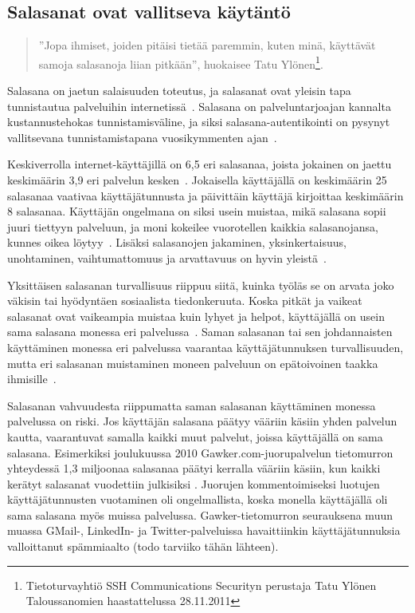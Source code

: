 \documentclass[finnish,gradu]{tktltiki}
\begin{document}
  \subsection{Salasanat ovat vallitseva käytäntö} %
  \label{sub:salasanat}

  \begin{quote}
    ''Jopa ihmiset, joiden pitäisi tietää paremmin, kuten minä, käyttävät samoja salasanoja liian pitkään'', huokaisee Tatu Ylönen\footnote{Tietoturvayhtiö SSH Communications Securityn perustaja Tatu Ylönen Taloussanomien haastattelussa 28.11.2011}.
  \end{quote}

  Salasana on jaetun salaisuuden toteutus, ja salasanat ovat yleisin tapa tunnistautua palveluihin internetissä~\cite{study_of_passwords_07, passpet_06, password_management_strategies_06, pwdhash_extension_05}. Salasana on palveluntarjoajan kannalta kustannustehokas tunnistamisväline, ja siksi salasana-autentikointi on pysynyt vallitsevana tunnistamistapana vuosikymmenten ajan~\cite{pw_auth_system_perspective_08}.

  Keskiverrolla internet-käyttäjillä on 6,5 eri salasanaa, joista jokainen on jaettu keskimäärin 3,9 eri palvelun kesken~\cite{study_of_passwords_07}. Jokaisella käyttäjällä on keskimäärin 25 salasanaa vaativaa käyttäjätunnusta ja päivittäin käyttäjä kirjoittaa keskimäärin 8 salasanaa. Käyttäjän ongelmana on siksi usein muistaa, mikä salasana sopii juuri tiettyyn palveluun, ja moni kokeilee vuorotellen kaikkia salasanojansa, kunnes oikea löytyy~\cite{study_of_passwords_07}. Lisäksi salasanojen jakaminen, yksinkertaisuus, unohtaminen, vaihtumattomuus ja arvattavuus on hyvin yleistä~\cite{password_management_strategies_06, pw_auth_system_perspective_08, passpet_06}.

  Yksittäisen salasanan turvallisuus riippuu siitä, kuinka työläs se on arvata joko väkisin tai hyödyntäen sosiaalista tiedonkeruuta. Koska pitkät ja vaikeat salasanat ovat vaikeampia muistaa kuin lyhyet ja helpot, käyttäjällä on usein sama salasana monessa eri palvelussa~\cite{study_of_passwords_07}. Saman salasanan tai sen johdannaisten käyttäminen monessa eri palvelussa vaarantaa käyttäjätunnuksen turvallisuuden, mutta eri salasanan muistaminen moneen palveluun on epätoivoinen taakka ihmisille~\cite{password_management_strategies_06, passpet_06, pw_auth_system_perspective_08, users_are_not_the_enemy_99}.

  Salasanan vahvuudesta riippumatta saman salasanan käyttäminen monessa palvelussa on riski. Jos käyttäjän salasana päätyy vääriin käsiin yhden palvelun kautta, vaarantuvat samalla kaikki muut palvelut, joissa käyttäjällä on sama salasana. Esimerkiksi joulukuussa 2010 Gawker.com-juorupalvelun tietomurron yhteydessä 1,3 miljoonaa salasanaa päätyi kerralla vääriin käsiin, kun kaikki kerätyt salasanat vuodettiin julkisiksi \cite{bbc_gawker_12_2010, forbes_gawker_12_2010}. Juorujen kommentoimiseksi luotujen käyttäjätunnusten vuotaminen oli ongelmallista, koska monella käyttäjällä oli sama salasana myös muissa palvelussa. Gawker-tietomurron seurauksena muun muassa GMail-, LinkedIn- ja Twitter-palveluissa havaittiinkin käyttäjätunnuksia valloittanut spämmiaalto (todo tarviiko tähän lähteen).
\end{document}

